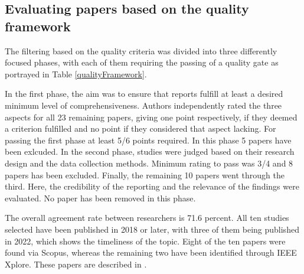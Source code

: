 \documentclass[a4paper,11pt,article,oneside]{memoir}
\begin{document}


\subsection{Evaluating papers based on the quality framework}


The filtering based on the quality criteria was divided into three differently focused phases, with each of them requiring the passing of a quality gate as portrayed in Table \ref{qualityFramework}. 




In the first phase, the aim was to ensure that reports fulfill at least a desired minimum level of comprehensiveness. Authors independently rated the three aspects for all 23 remaining papers, giving one point respectively, if they deemed a criterion fulfilled and no point if they considered that aspect lacking. For passing the first phase at least 5/6 points required. In this phase 5 papers have been exlcuded. In the second phase, studies were judged based on their research design and the data collection methods. Minimum rating to pass was 3/4 and 8 papers has been excluded. Finally, the remaining 10 papers went through the third. Here, the credibility of the reporting and the relevance of the findings were evaluated. No paper has been removed in this phase.

The overall agreement rate between researchers is 71.6 percent. All ten studies selected have been published in 2018 or later, with three of them being published in 2022, which shows the timeliness of the topic. Eight of the ten papers were found via Scopus, whereas the remaining two have been identified through IEEE Xplore. These papers are described in \citet{foundPapers}.
\end{document}
